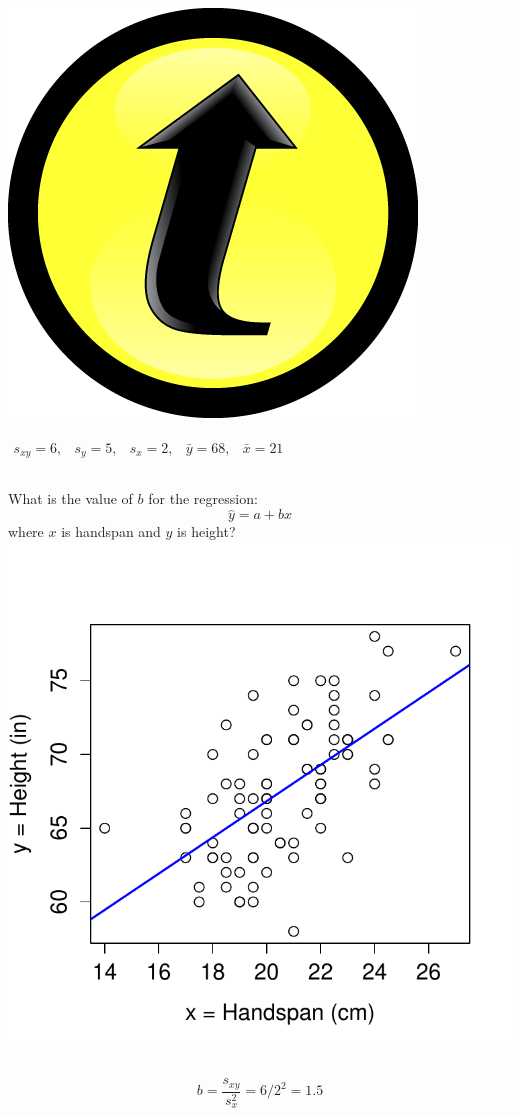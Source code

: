 \documentclass[handout]{beamer}
\begin{document}
\begin{frame}
\frametitle{\includegraphics[scale = 0.05]{./images/clicker}}
\alert{$\begin{array}{ccccc} s_{xy} = 6,&s_y = 5,& s_x = 2,& \bar{y} = 68,& \bar{x} = 21\end{array}$}
\begin{columns}[c]
\column{2.5in}
What is the value of $b$ for the regression: $$\hat{y}=a+bx$$
where \alert{$x$ is handspan and $y$ is height? }
\column{1.8in}
\includegraphics[scale = 0.4]{./images/handspan_height2}
\end{columns}
\alert{$$b = \frac{s_{xy}}{s_x^2} = 6 /2^2 = 1.5 $$}
\end{frame}
\end{document}
